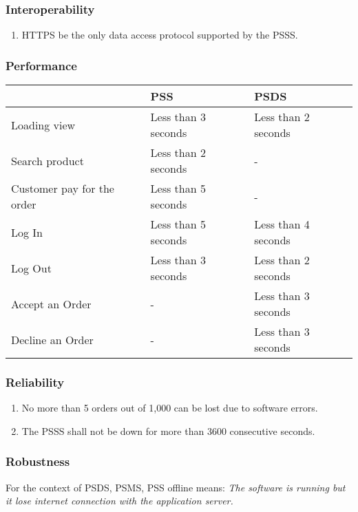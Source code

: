 \subsubsection{Interoperability}
\begin{enumerate}[label=IOP-\arabic*]
    \item HTTPS be the only data access protocol supported by the PSSS.
\end{enumerate}

\subsubsection{Performance}
\begin{center}
    \begin{tabular}{p{}p{}p{}}
    \hline
    \textbf{} & \textbf{PSS} & \textbf{PSDS} \\ 
     \hline
     Loading view & Less than 3 seconds & Less than 2 seconds \\  
     \hline
     Search product & Less than 2 seconds & - \\  
     \hline
     Customer pay for the order & Less than 5 seconds & - \\  
     \hline
     Log In & Less than 5 seconds & Less than 4 seconds \\  
     \hline
     Log Out & Less than 3 seconds & Less than 2 seconds \\  
     \hline
     Accept an Order & - & Less than 3 seconds \\  
     \hline
     Decline an Order & - & Less than 3 seconds \\  
     \hline
    \end{tabular}
\end{center}

\pagebreak

\subsubsection{Reliability}
\begin{enumerate}[label=REL-\arabic*]
    \item No more than 5 orders out of 1,000 can be lost due to software errors.
    \item The PSSS shall not be down for more than 3600 consecutive seconds.
\end{enumerate}

\subsubsection{Robustness}
For the context of PSDS, PSMS, PSS offline means: \textit{The software is 
running but it lose internet connection with the application server.}

